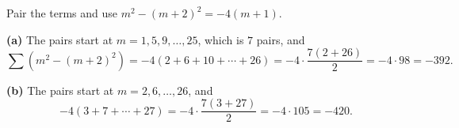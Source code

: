 Pair the terms and use $m^2-(m+2)^2=-4(m+1)$.

\textbf{(a)} The pairs start at $m=1,5,9,\dots,25$, which is $7$ pairs, and
\[\sum\left(m^2-(m+2)^2\right)=-4(2+6+10+\cdots+26)=-4\cdot\dfrac{7(2+26)}{2}=-4\cdot98=\boxed{-392}.\]

\textbf{(b)} The pairs start at $m=2,6,\dots,26$, and
\[-4(3+7+\cdots+27)=-4\cdot\dfrac{7(3+27)}{2}=-4\cdot105=\boxed{-420}.\]
